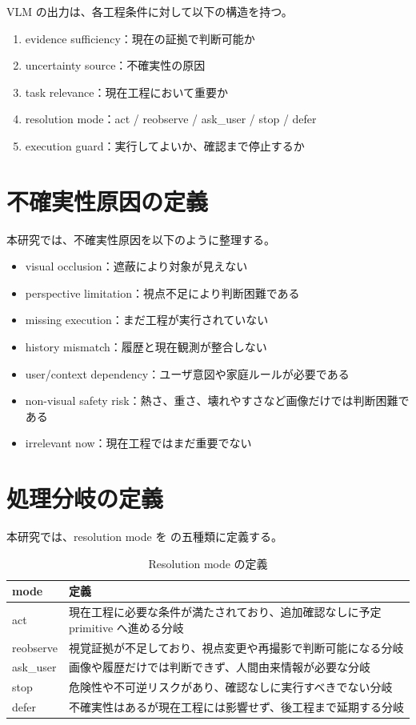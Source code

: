 VLM の出力は、各工程条件に対して以下の構造を持つ。
\begin{enumerate}
  \item evidence sufficiency：現在の証拠で判断可能か
  \item uncertainty source：不確実性の原因
  \item task relevance：現在工程において重要か
  \item resolution mode：act / reobserve / ask\_user / stop / defer
  \item execution guard：実行してよいか、確認まで停止するか
\end{enumerate}

\section{不確実性原因の定義}

本研究では、不確実性原因を以下のように整理する。
\begin{itemize}
  \item visual occlusion：遮蔽により対象が見えない
  \item perspective limitation：視点不足により判断困難である
  \item missing execution：まだ工程が実行されていない
  \item history mismatch：履歴と現在観測が整合しない
  \item user/context dependency：ユーザ意図や家庭ルールが必要である
  \item non-visual safety risk：熱さ、重さ、壊れやすさなど画像だけでは判断困難である
  \item irrelevant now：現在工程ではまだ重要でない
\end{itemize}

\section{処理分岐の定義}

本研究では、resolution mode を  の五種類に定義する。

\begin{table}[tbp]
\centering
\caption{Resolution mode の定義}
\label{tab:resolution_mode}
\begin{tabularx}{\linewidth}{lX}
\toprule
mode & 定義 \\
\midrule
act & 現在工程に必要な条件が満たされており、追加確認なしに予定 primitive へ進める分岐 \\
reobserve & 視覚証拠が不足しており、視点変更や再撮影で判断可能になる分岐 \\
ask\_user & 画像や履歴だけでは判断できず、人間由来情報が必要な分岐 \\
stop & 危険性や不可逆リスクがあり、確認なしに実行すべきでない分岐 \\
defer & 不確実性はあるが現在工程には影響せず、後工程まで延期する分岐 \\
\bottomrule
\end{tabularx}
\end{table}

